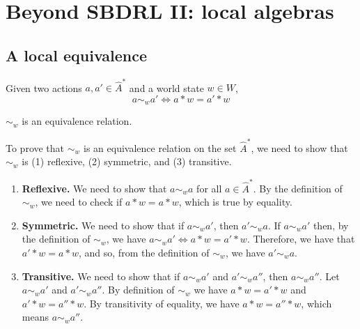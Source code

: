 \chapter{
Beyond SBDRL II: local algebras
}

\section{
A local equivalence
}

\begin{definition}
	Given two actions $a, a' \in \hat{A}^{*}$ and a world state $w \in W$,
	\begin{equation}
		a \sim_{w} a' \iff a \ast w = a' \ast w
	\end{equation}
\end{definition}

\begin{propositionE}
    $\sim_{w}$ is an equivalence relation.
\end{propositionE}
\begin{proofE}
    To prove that $\sim_{w}$ is an equivalence relation on the set $\hat{A}^{*}$, we need to show that $\sim_{w}$ is (1) reflexive, (2) symmetric, and (3) transitive.
    \begin{enumerate}
        \item \textbf{Reflexive.}
        We need to show that $a \sim_{w} a$ for all $a \in \hat{A}^{*}$.
        By the definition of $\sim_{w}$, we need to check if $a \ast w = a \ast w$, which is true by equality.

        \item \textbf{Symmetric.}
        We need to show that if $a \sim_{w} a'$, then $a' \sim_{w} a$.
        If $a \sim_{w} a'$ then, by the definition of $\sim_{w}$, we have $a \sim_{w} a' \iff a \ast w = a' \ast w$.
        Therefore, we have that $a' \ast w = a \ast w$, and so, from the definition of $\sim_{w}$, we have $a' \sim_{w} a$.

        \item \textbf{Transitive.}
        We need to show that if $a \sim_{w} a'$ and $a' \sim_{w} a''$, then $a \sim_{w} a''$.
        Let $a \sim_{w} a'$ and $a' \sim_{w} a''$.
        By definition of $\sim_{w}$ we have $a \ast w = a' \ast w$ and $a' \ast w = a'' \ast w$.
        By transitivity of equality, we have $a \ast w = a'' \ast w$, which means $a \sim_{w} a''$.
    \end{enumerate}
\end{proofE}

